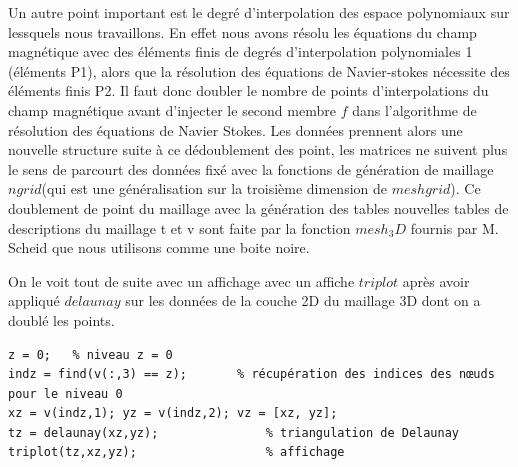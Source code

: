 \documentclass[a4paper,12pt,titlepage]{report}
\begin{document}
\begin{onehalfspace}
Un autre point important est le degré d'interpolation des espace polynomiaux sur lessquels nous travaillons. En effet nous avons résolu les équations du champ magnétique avec des éléments finis de degrés d'interpolation polynomiales 1 (éléments P1), alors que la résolution des équations de Navier-stokes nécessite des éléments finis P2. Il faut donc doubler le nombre de points d'interpolations du champ magnétique avant d'injecter le second membre $f$ dans l'algorithme de résolution des équations de Navier Stokes. Les données prennent alors une nouvelle structure suite à ce dédoublement des point, les matrices ne suivent plus le sens de parcourt des données fixé avec la fonctions de génération de maillage $ngrid$(qui est une généralisation sur la troisième dimension  de $meshgrid$). Ce doublement de point du maillage avec la génération des tables nouvelles tables de descriptions du maillage t et v sont faite par la fonction $mesh_3D$ fournis par M. Scheid que nous utilisons comme une boite noire.

On le voit tout de suite avec un affichage avec un affiche $triplot$ après avoir appliqué $delaunay$ sur les données de la couche 2D du maillage 3D dont on a doublé les points.
\begin{verbatim}
z = 0;   % niveau z = 0
indz = find(v(:,3) == z);		% récupération des indices des nœuds pour le niveau 0
xz = v(indz,1); yz = v(indz,2); vz = [xz, yz];
tz = delaunay(xz,yz);               % triangulation de Delaunay 
triplot(tz,xz,yz);   				% affichage
\end{verbatim}


\end{onehalfspace}
\end{document}
